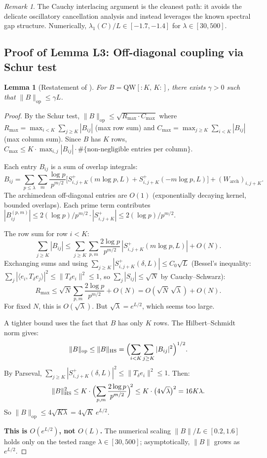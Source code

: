 \documentclass[12pt,a4paper]{article}
\newtheorem{lemma}[theorem]{Lemma}
\theoremstyle{definition}
\theoremstyle{remark}
\newtheorem{remark}[theorem]{Remark}
\begin{document}
\begin{remark}
The Cauchy interlacing argument is the cleanest path: it avoids the delicate oscillatory cancellation analysis and instead leverages the known spectral gap structure. Numerically, $\lambda_1(C)/L \in [-1.7, -1.4]$ for $\lambda \in [30, 500]$.
\end{remark}

\subsection{Proof of Lemma L3: Off-diagonal coupling via Schur test}

\begin{lemma}[Restatement of ]
For $B = \mathrm{QW}[{:}K,\,K{:}]$, there exists $\gamma > 0$ such that $\|B\|_{\mathrm{op}} \leq \gamma L$.
\end{lemma}

\begin{proof}
By the Schur test, $\|B\|_{\mathrm{op}} \leq \sqrt{R_{\max}\cdot C_{\max}}$ where $R_{\max} = \max_{i < K}\sum_{j \geq K}|B_{ij}|$ (max row sum) and $C_{\max} = \max_{j \geq K}\sum_{i < K}|B_{ij}|$ (max column sum). Since $B$ has $K$ rows, $C_{\max} \leq K \cdot \max_{i,j}|B_{ij}| \cdot \#\{\text{non-negligible entries per column}\}$.

Each entry $B_{ij}$ is a sum of overlap integrals:
\[
  B_{ij} = \sum_{p \leq \lambda}\sum_m \frac{\log p}{p^{m/2}}\bigl[S_{i,j+K}^+(m\log p, L) + S_{i,j+K}^+(-m\log p, L)\bigr] + (W_{\mathrm{arch}})_{i,j+K}.
\]
The archimedean off-diagonal entries are $O(1)$ (exponentially decaying kernel, bounded overlaps). Each prime term contributes
$|B_{ij}^{(p,m)}| \leq 2(\log p)/p^{m/2} \cdot |S_{i,j+K}^+| \leq 2(\log p)/p^{m/2}$.

The row sum for row $i < K$:
\[
  \sum_{j \geq K}|B_{ij}|
  \leq \sum_{j \geq K}\sum_{p,m}\frac{2\log p}{p^{m/2}}\,|S_{i,j+K}^+(m\log p, L)| + O(N).
\]
Exchanging sums and using $\sum_{j \geq K} |S_{i,j+K}^+(\delta, L)| \leq C_0\sqrt{L}$ (Bessel's inequality: $\sum_j |\langle e_i, T_\delta e_j\rangle|^2 \leq \|T_\delta e_i\|^2 \leq 1$, so $\sum_j |S_{ij}| \leq \sqrt{N}$ by Cauchy--Schwarz):
\[
  R_{\max} \leq \sqrt{N}\sum_{p,m}\frac{2\log p}{p^{m/2}} + O(N) = O(\sqrt{N}\,\sqrt{\lambda}) + O(N).
\]
For fixed $N$, this is $O(\sqrt{\lambda})$. But $\sqrt{\lambda} = e^{L/2}$, which seems too large.

A tighter bound uses the fact that $B$ has only $K$ rows. The Hilbert--Schmidt norm gives:
\[
  \|B\|_{\mathrm{op}} \leq \|B\|_{\mathrm{HS}} = \Bigl(\sum_{i < K}\sum_{j \geq K}|B_{ij}|^2\Bigr)^{1/2}.
\]
By Parseval, $\sum_{j \geq K} |S_{i,j+K}^+(\delta,L)|^2 \leq \|T_\delta e_i\|^2 \leq 1$. Then:
\[
  \|B\|_{\mathrm{HS}}^2
  \leq K\cdot\Bigl(\sum_{p,m}\frac{2\log p}{p^{m/2}}\Bigr)^{\!2}
  \leq K\cdot\bigl(4\sqrt{\lambda}\bigr)^2 = 16K\lambda.
\]
So $\|B\|_{\mathrm{op}} \leq 4\sqrt{K\lambda} = 4\sqrt{K}\,e^{L/2}$.

\textbf{This is $O(e^{L/2})$, not $O(L)$.} The numerical scaling $\|B\|/L \in [0.2, 1.6]$ holds only on the tested range $\lambda \in [30, 500]$; asymptotically, $\|B\|$ grows as $e^{L/2}$.
\end{proof}
\end{document}
